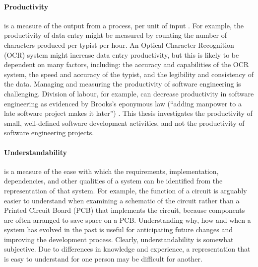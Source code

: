 \paragraph{Productivity} is a measure of the output from a process, per unit of input \cite{beattie07economics}. For example, the productivity of data entry might be measured by counting the number of characters produced per typist per hour. An Optical Character Recognition (OCR) system might increase data entry productivity, but this is likely to be dependent on many factors, including: the accuracy and capabilities of the OCR system, the speed and accuracy of the typist, and the legibility and consistency of the data. Managing and measuring the productivity of software engineering is challenging. Division of labour, for example, can decrease productivity in software engineering as evidenced by Brooks's eponymous law (``adding manpower to a late software project makes it later'') \cite{brooks95mythical}. This thesis investigates the productivity of small, well-defined software development activities, and not the productivity of software engineering projects.

\paragraph{Understandability} is a measure of the ease with which the requirements, implementation, dependencies, and other qualities of a system can be identified from the representation of that system. For example, the function of a circuit is arguably easier to understand when examining a schematic of the circuit rather than a Printed Circuit Board (PCB) that implements the circuit, because components are often arranged to save space on a PCB. Understanding why, how and when a system has evolved in the past is useful for anticipating future changes and improving the development process. Clearly, understandability is somewhat subjective. Due to differences in knowledge and experience, a representation that is easy to understand for one person may be difficult for another. 



